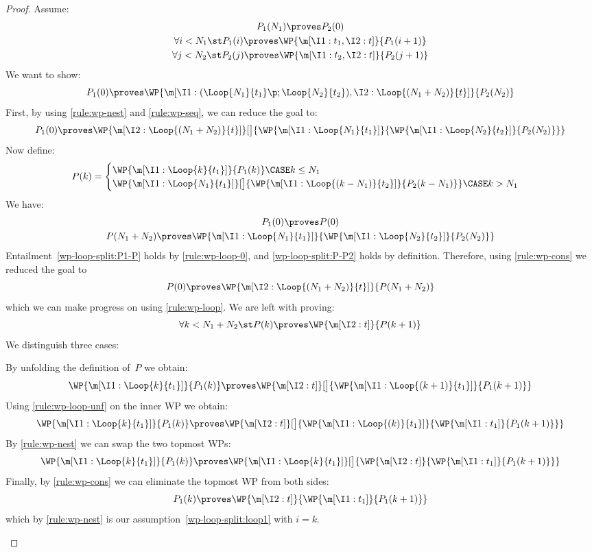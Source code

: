 \begin{proof}
  Assume:
  \begin{gather}
  P_1(N_1) \proves P_2(0)
  \label{wp-loop-split:P1-P2}
  \\
  \forall i < N_1 \st
    P_1(i) \proves \WP{\m[\I1: t_1, \I2: t]}{P_1(i+1)}
  \label{wp-loop-split:loop1}
  \\
  \forall j < N_2 \st
    P_2(j) \proves \WP{\m[\I1: t_2, \I2: t]}{P_2(j+1)}
  \label{wp-loop-split:loop2}
  \end{gather}
  We want to show:
  \[
    P_1(0) \proves
    \WP{\m[
      \I1: (\Loop{N_1}{t_1}\p;\Loop{N_2}{t_2}),
      \I2: \Loop{(N_1+N_2)}{t}
    ]}{P_2(N_2)}
  \]
  First, by using \ref{rule:wp-nest} and \ref{rule:wp-seq},
  we can reduce the goal to:
  \[
    P_1(0) \proves
    \WP{\m[\I2: \Loop{(N_1+N_2)}{t}]}[\big]{
      \WP{\m[\I1: \Loop{N_1}{t_1}]}{
        \WP{\m[\I1:\Loop{N_2}{t_2}]}{P_2(N_2)}
       }
    }
  \]
  Now define:
  \[
    P(k) =
    \begin{cases}
    \WP {\m[\I1: \Loop{k}{t_1}]} { P_1(k) }
    \CASE k \leq N_1
    \\
    \WP {\m[\I1: \Loop{N_1}{t_1}]}[\big]{
      \WP {\m[\I1: \Loop{(k-N_1)}{t_2}]} { P_2(k-N_1) }
    }
    \CASE k > N_1
    \end{cases}
  \]
  We have:
  \begin{gather}
    P_1(0) \proves P(0)
    \label{wp-loop-split:P1-P}
    \\
    P(N_1+N_2) \proves
    \WP{\m[\I1: \Loop{N_1}{t_1}]}{
      \WP{\m[\I1:\Loop{N_2}{t_2}]}{P_2(N_2)}
     }
    \label{wp-loop-split:P-P2}
  \end{gather}
  Entailment~\eqref{wp-loop-split:P1-P} holds by \ref{rule:wp-loop-0},
  and \eqref{wp-loop-split:P-P2} holds by definition.
  Therefore, using \ref{rule:wp-cons} we reduced the goal to
  \[
    P(0) \proves \WP{\m[\I2: \Loop{(N_1+N_2)}{t}]}{P(N_1+N_2)}
  \]
  which we can make progress on using \ref{rule:wp-loop}.
  We are left with proving:
  \[
    \forall k < N_1+N_2\st
    P(k) \proves
    \WP {\m[\I2: t]} {P(k+1)}
  \]
  We distinguish three cases:
  \begin{casesplit}
  \case[$k<N_1$] By unfolding the definition of~$P$ we obtain:
    \[
      \WP {\m[\I1: \Loop{k}{t_1}]} { P_1(k) }
      \proves
      \WP {\m[\I2: t]}[\big]{
        \WP {\m[\I1: \Loop{(k+1)}{t_1}]} { P_1(k+1) }
      }
    \]
    Using \ref{rule:wp-loop-unf} on the inner WP we obtain:
    \[
      \WP {\m[\I1: \Loop{k}{t_1}]} { P_1(k) }
      \proves
      \WP {\m[\I2: t]}[\big]{
        \WP {\m[\I1: \Loop{(k)}{t_1}]} { \WP{\m[\I1: t_1]}{P_1(k+1)} }
      }
    \]
    By \ref{rule:wp-nest} we can swap the two topmost WPs:
    \[
      \WP {\m[\I1: \Loop{k}{t_1}]} { P_1(k) }
      \proves
      \WP {\m[\I1: \Loop{k}{t_1}]}[\big]{
        \WP {\m[\I2: t]} { \WP{\m[\I1: t_1]}{P_1(k+1)} }
      }
    \]
    Finally, by \ref{rule:wp-cons} we can eliminate the topmost WP from both sides:
    \[
      P_1(k)
      \proves
      \WP {\m[\I2: t]} { \WP{\m[\I1: t_1]}{P_1(k+1)} }
    \]
    which by \ref{rule:wp-nest} is our assumption~\eqref{wp-loop-split:loop1}
    with $i=k$.


\end{casesplit}
\end{proof}
